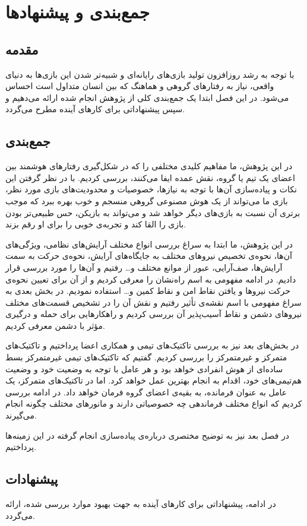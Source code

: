 \newpage
\chapter{جمع‌بندی و پیشنهادها}
\newpage
\section{مقدمه}
با توجه به رشد روزافزون تولید بازی‌های رایانه‌ای و شبیه‌تر شدن این بازی‌ها به دنیای واقعی، نیاز به رفتارهای گروهی و هماهنگ که بین انسان متداول است احساس می‌شود. در این فصل ابتدا یک جمع‌بندی کلی از پژوهش انجام شده ارائه می‌دهیم و سپس پیشنهاداتی برای کارهای آینده مطرح می‌گردد.
\section{جمع‌بندی}
در این پژوهش، ما مفاهیم کلیدی مختلفی را که در شکل‌گیری رفتارهای هوشمند بین اعضای یک تیم یا گروه، نقش
عمده ایفا می‌کنند، بررسی کردیم. با در نظر گرفتن این نکات و پیاده‌سازی آن‌ها با توجه به نیازها، خصوصیات و
محدودیت‌های بازی مورد نظر، بازی ما می‌تواند از یک هوش مصنوعی گروهی منسجم و خوب بهره ببرد که موجب برتری آن
نسبت به بازی‌های دیگر خواهد شد و می‌تواند به بازیکن، حس طبیعی‌تر بودن بازی را القا کند و تجربه‌ی خوبی را برای
او رقم بزند.

در این پژوهش، ما ابتدا به سراغ بررسی انواع مختلف آرایش‌های نظامی، ویژگی‌های آن‌ها،
نحوه‌ی تخصیص نیروهای مختلف به جایگاه‌های آرایش، نحوه‌ی حرکت به سمت آرایش‌ها، صف‌آرایی، عبور از موانع مختلف و…
رفتیم و آن‌ها را مورد بررسی قرار دادیم. در ادامه مفهومی به اسم راه‌نشان را معرفی کردیم و از آن برای تعیین
نحوه‌ی حرکت نیروها و یافتن نقاط امن و نقاط کمین و… استفاده نمودیم. در بخش بعدی به سراغ مفهومی با اسم
نقشه‌ی تأثیر رفتیم و نقش آن را در تشخیص قسمت‌های مختلف نیروهای دشمن و نقاط آسیب‌پذیر آن بررسی کردیم و
راهکارهایی برای حمله و درگیری مؤثر با دشمن معرفی کردیم.

در بخش‌های بعد نیز به بررسی تاکتیک‌های تیمی و همکاری اعضا پرداختیم و تاکتیک‌های متمرکز و غیرمتمرکز را بررسی
کردیم. گفتیم که تاکتیک‌های تیمی غیرمتمرکز بسط ساده‌ای از هوش انفرادی خواهد بود و هر عامل با توجه به وضعیت خود
و وضعیت هم‌تیمی‌های خود، اقدام به انجام بهترین عمل خواهد کرد. اما در تاکتیک‌های متمرکز، یک عامل
به عنوان فرمانده، به بقیه‌ی اعضای گروه فرمان خواهد داد. در ادامه بررسی کردیم که انواع مختلف فرماندهی
چه خصوصیاتی دارند و مانورهای مختلف چگونه انجام می‌گیرند.

در فصل بعد نیز به توضیح مختصری درباره‌ی پیاده‌سازی انجام گرفته در این زمینه‌ها پرداختیم.


\section{پیشنهادات}
در ادامه، پیشنهاداتی برای کارهای آینده به جهت بهبود موارد بررسی شده، ارائه می‌گردد.
